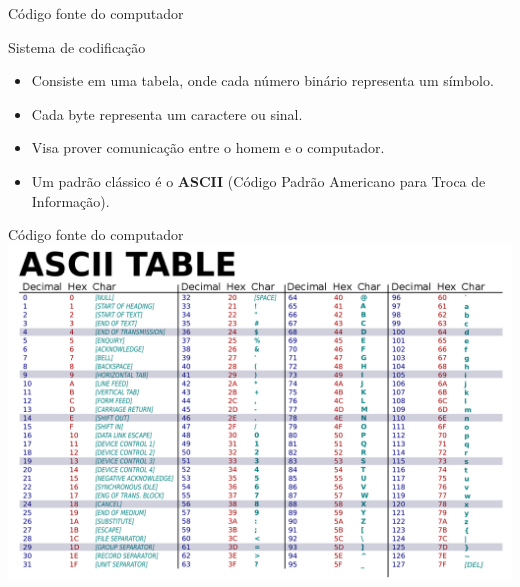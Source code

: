 \begin{frame}{Código fonte do computador}
	\begin{block}{Sistema de codificação}
		\begin{itemize}
			\item Consiste em uma tabela, onde cada número binário representa um símbolo.
			\item Cada byte representa um caractere ou sinal.
			\item Visa prover comunicação entre o homem e o computador.
			\item Um padrão clássico é o \textbf{ASCII} (Código Padrão Americano para Troca de Informação).
		\end{itemize}
	\end{block}

\end{frame}


\begin{frame}{Código fonte do computador}
	\centering
	\includegraphics[width=0.9\linewidth]{Figuras/Ch02/fig2}
\end{frame}


